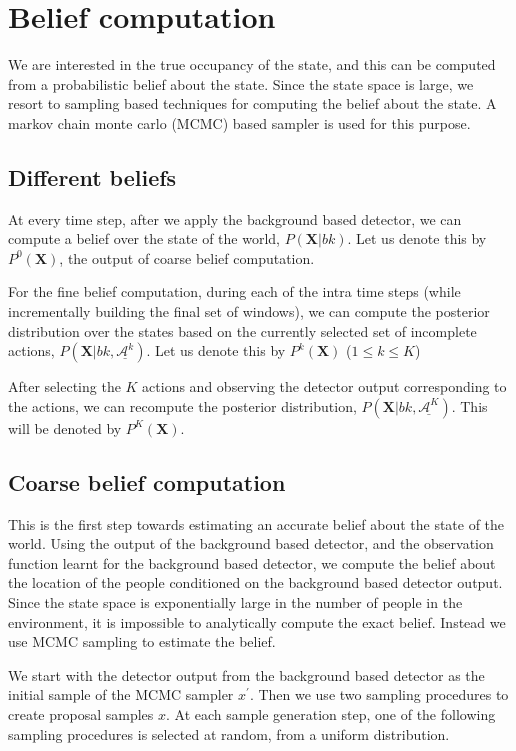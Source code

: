 \documentclass[10pt,twocolumn,letterpaper]{article}
\begin{document}
\section{Belief computation}
We are interested in the true occupancy of the state, and this can be computed from a probabilistic belief about the state. Since the state space is large, we resort to sampling based techniques for computing the belief about the state. A markov chain monte carlo (MCMC) based sampler is used for this purpose.

\subsection{Different beliefs}
At every time step, after we apply the background based detector, we can compute a belief over the state of the world, $P(\textbf{X}|bk)$. Let us denote this by $ P^{0}(\textbf{X})$, the output of coarse belief computation.

For the fine belief computation, during each of the intra time steps (while incrementally building the final set of windows), we can compute the posterior distribution over the states based on the currently selected set of incomplete actions, $ P(\textbf{X}|bk,\underline{\mathcal{A}^{k}} )$. Let us denote this by $ P^{k}(\textbf{X})$ ($1 \leq k \leq K $)

After selecting the $K $ actions and observing the detector output corresponding to the actions, we can recompute the posterior distribution, $P(\textbf{X}|bk, \underline{\mathcal{A}^{K}})$. This will be denoted by $P^{K}(\textbf{X})$.

\subsection{Coarse belief computation}
This is the first step towards estimating an accurate belief about the state of the world. Using the output of the background based detector, and the observation function learnt for the background based detector, we compute the belief about the location of the people conditioned on the background based detector output. Since the state space is exponentially large in the number of people in the environment, it is impossible to analytically compute the exact belief. Instead we use MCMC sampling to estimate the belief. 

We start with the detector output from the background based detector as the initial sample of the MCMC sampler $x^{'}$. Then we use two sampling procedures to create proposal samples $x$. At each sample generation step, one of the following sampling procedures is selected at random, from a uniform distribution.
\end{document}
